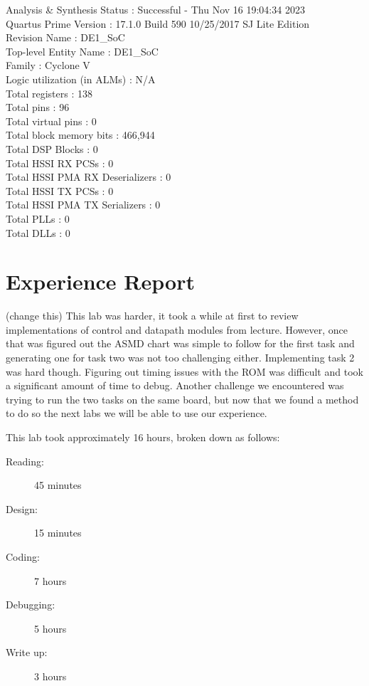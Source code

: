 \documentclass[11pt, titlepage]{article}
\begin{document}
\begin{description}
                    Analysis \& Synthesis Status : Successful - Thu Nov 16 19:04:34 2023 \\
                    Quartus Prime Version : 17.1.0 Build 590 10/25/2017 SJ Lite Edition \\
                    Revision Name : DE1\_SoC \\
                    Top-level Entity Name : DE1\_SoC \\
                    Family : Cyclone V \\
                    Logic utilization (in ALMs) : N/A \\
                    Total registers : 138 \\
                    Total pins : 96 \\
                    Total virtual pins : 0 \\
                    Total block memory bits : 466,944 \\
                    Total DSP Blocks : 0 \\
                    Total HSSI RX PCSs : 0 \\
                    Total HSSI PMA RX Deserializers : 0 \\
                    Total HSSI TX PCSs : 0 \\
                    Total HSSI PMA TX Serializers : 0 \\
                    Total PLLs : 0 \\
                    Total DLLs : 0
            \end{description}
            
    \newpage
    \section{Experience Report}
        (change this)
        This lab was harder, it took a while at first to review implementations of control and datapath modules from lecture. However, once that was figured out the ASMD chart was simple to follow for the first task and generating one for task two was not too challenging either. Implementing task 2 was hard though. Figuring out timing issues with the ROM was difficult and took a significant amount of time to debug. Another challenge we encountered was trying to run the two tasks on the same board, but now that we found a method to do so the next labs we will be able to use our experience.
    

        This lab took approximately 16 hours, broken down as follows:
        \begin{description}
            \item[Reading:] 45 minutes
            \item[Design:] 15 minutes
            \item[Coding:] 7 hours
            \item[Debugging:] 5 hours
            \item[Write up:] 3 hours
        \end{description}   
        
\end{document}
